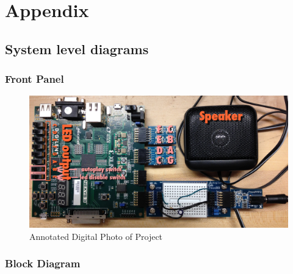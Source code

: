 \documentclass{article}
\begin{document}
\newpage
\singlespacing
\section{Appendix}
  	\listoffigures
  	\listoftables

  	\newpage
  	\subsection{System level diagrams}

    \subsubsection{Front Panel}
      

	    \begin{figure}[H]
	    	\centering
	    	\includegraphics[width=6.5in]{img/annotated.jpg}
	    	\caption{Annotated Digital Photo of Project}
	    \end{figure}

    \subsubsection{Block Diagram}
\end{document}
